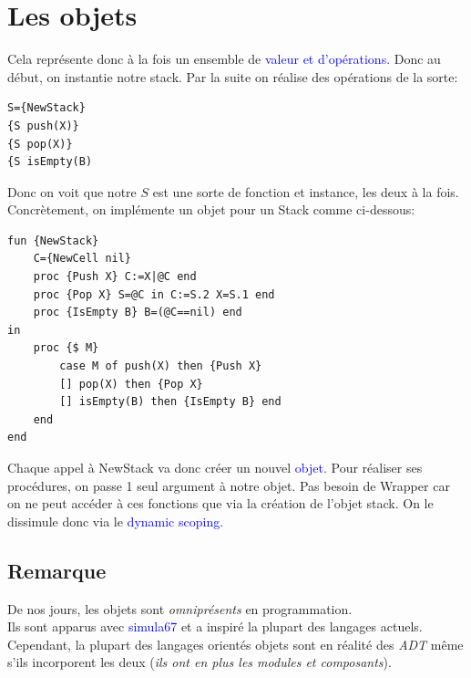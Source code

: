 \documentclass{report}
\begin{document}
\section{Les objets}
Cela représente donc à la fois un ensemble de \textcolor{blue}{valeur et d'opérations}. Donc au début, on instantie notre stack. Par la suite on réalise des opérations de la sorte:
\begin{lstlisting}[escapechar=\%]
S={NewStack} 
{S push(X)} 
{S pop(X)}
{S isEmpty(B)
\end{lstlisting}
Donc on voit que notre $S$ est une sorte de fonction et instance, les deux à la fois. Concrètement, on implémente un objet pour un Stack comme ci-dessous:
\begin{lstlisting}[escapechar=\%]
fun {NewStack} 
	C={NewCell nil} 
	proc {Push X} C:=X|@C end 
	proc {Pop X} S=@C in C:=S.2 X=S.1 end 
	proc {IsEmpty B} B=(@C==nil) end
in
	proc {$ M}
		case M of push(X) then {Push X} 
		[] pop(X) then {Pop X} 
		[] isEmpty(B) then {IsEmpty B} end
	end
end
\end{lstlisting}
Chaque appel à NewStack va donc créer un nouvel \textcolor{blue}{objet}. Pour réaliser ses procédures, on passe 1 seul argument à notre objet. Pas besoin de Wrapper car on ne peut accéder à ces fonctions que via la création de l'objet stack. On le dissimule donc via le \textcolor{blue}{dynamic scoping}.

\subsection{Remarque}
De nos jours, les objets sont \textit{omniprésents} en programmation.\\
Ils sont apparus avec \textcolor{blue}{simula67} et a inspiré la plupart des langages actuels.\\
Cependant, la plupart des langages orientés objets sont en réalité des \textit{ADT} même s'ils incorporent les deux (\textit{ils ont en plus les modules et composants}).
\end{document}
